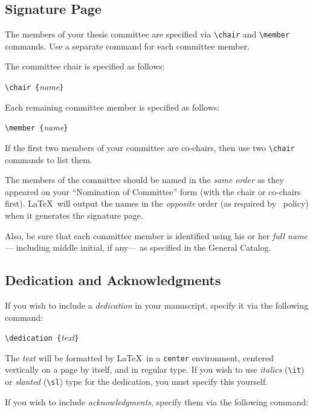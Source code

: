 \subsection {Signature Page}

The members of your thesis committee are specified via
\verb+\chair+ and \verb+\member+ commands.
Use a separate command for each committee member.

The committee chair is specified as follows:

\begin {center} \verb+\chair {+{\sl name\/}\verb+}+ \end {center}

Each remaining committee member is specified as follows:

\begin {center} \verb+\member {+{\sl name\/}\verb+}+ \end {center}

If the first two members of your committee are co-chairs, then use two
\verb+\chair+ commands to list them.

The members of the committee should be named in the {\em same order\/}
as they appeared on your ``Nomination of Committee'' form
(with the chair or co-chairs first).
\LaTeX\ will output the names in the {\em opposite\/} order
(as required by \ucla\ policy)
when it generates the signature page.

Also, be sure that each committee member
is identified using his or her {\em full name}---%
including middle initial, if any---%
as specified in the General Catalog.

\subsection {Dedication and Acknowledgments}

If you wish to include a {\em dedication\/} in your manuscript,
specify it via the following command:

\begin {center} \verb+\dedication {+{\sl text\/}\verb+}+ \end {center}

The {\sl text} will be formatted by \LaTeX\
in a \verb+center+ environment,
centered vertically on a page by itself,
and in regular type.
If you wish to use {\it italics\/} (\verb+\it+)
or {\sl slanted\/} (\verb+\sl+) type
for the dedication, you must specify this yourself.

If you wish to include {\em acknowledgments,}
specify them via the following command:

